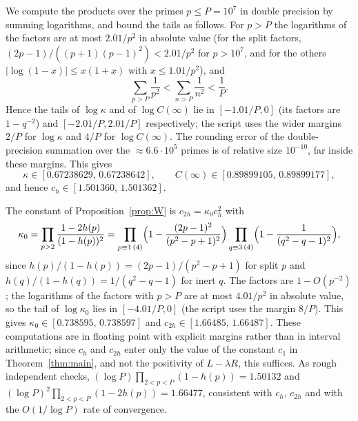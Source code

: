 \documentclass[11pt]{amsart}
\theoremstyle{remark}
\begin{document}
We compute the products over the primes $p\le P=10^7$ in double precision by summing logarithms, and bound the tails as follows. For $p>P$ the logarithms of the factors are at most $2.01/p^2$ in absolute value (for the split factors, $(2p-1)/((p+1)(p-1)^2)<2.01/p^2$ for $p>10^7$, and for the others $|\log(1-x)|\le x(1+x)$ with $x\le1.01/p^2$), and
\[
\sum_{p>P}\frac1{p^2}<\sum_{n>P}\frac1{n^2}<\frac1P .
\]
Hence the tails of $\log\kappa$ and of $\log C(\infty)$ lie in $[-1.01/P,0]$ (its factors are $1-q^{-2}$) and $[-2.01/P,2.01/P]$ respectively; the script uses the wider margins $2/P$ for $\log\kappa$ and $4/P$ for $\log C(\infty)$. The rounding error of the double-precision summation over the $\approx6.6\cdot10^5$ primes is of relative size $10^{-10}$, far inside these margins. This gives
\[
\kappa\in[0.67238629,\,0.67238642],\qquad C(\infty)\in[0.89899105,\,0.89899177],
\]
and hence $c_h\in[1.501360,\,1.501362]$.

The constant of Proposition~\ref{prop:W} is $c_{2h}=\kappa_0c_h^2$ with
\[
\kappa_0=\prod_{p>2}\frac{1-2h(p)}{(1-h(p))^2}=\prod_{p\equiv1\,(4)}\Bigl(1-\frac{(2p-1)^2}{(p^2-p+1)^2}\Bigr)\prod_{q\equiv3\,(4)}\Bigl(1-\frac1{(q^2-q-1)^2}\Bigr),
\]
since $h(p)/(1-h(p))=(2p-1)/(p^2-p+1)$ for split $p$ and $h(q)/(1-h(q))=1/(q^2-q-1)$ for inert $q$. The factors are $1-O(p^{-2})$; the logarithms of the factors with $p>P$ are at most $4.01/p^2$ in absolute value, so the tail of $\log\kappa_0$ lies in $[-4.01/P,0]$ (the script uses the margin $8/P$). This gives $\kappa_0\in[0.738595,\,0.738597]$ and $c_{2h}\in[1.66485,\,1.66487]$.
These computations are in floating point with explicit margins rather than in interval arithmetic; since $c_h$ and $c_{2h}$ enter only the value of the constant $c_1$ in Theorem~\ref{thm:main}, and not the positivity of $L-\lambda R$, this suffices. As rough independent checks, $(\log P)\prod_{2<p<P}(1-h(p))=1.50132$ and $(\log P)^2\prod_{2<p<P}(1-2h(p))=1.66477$, consistent with $c_h$, $c_{2h}$ and with the $O(1/\log P)$ rate of convergence.

\end{document}
